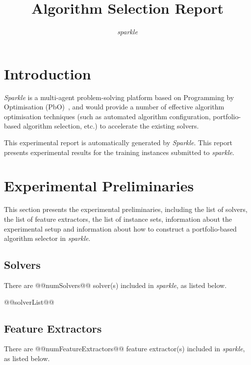 \documentclass[british]{article}
\title{Algorithm Selection Report}
\author{ \emph{sparkle} }
\newif\iftest
\begin{document}
\maketitle %


\section{Introduction}
\label{sec:Introduction}

\emph{Sparkle} \cite{Hoos15} is a multi-agent problem-solving platform based on Programming by Optimisation (PbO)~\cite{Hoos12}, and would provide a number of effective algorithm optimisation techniques (such as automated algorithm configuration, portfolio-based algorithm selection, etc.) to accelerate the existing solvers.

This experimental report is automatically generated by \emph{Sparkle}. This report presents experimental results for the training instances submitted to \emph{sparkle}\iftest, as well as for running the \emph{sparkle} portfolio selector to solve the test instances in the instance set @@testInstanceClass@@\fi.

\section{Experimental Preliminaries}
\label{sec:Experimental_Preliminaries}

This section presents the experimental preliminaries, including the list of solvers, the list of feature extractors, the list of instance sets, information about the experimental setup and information about how to construct a portfolio-based algorithm selector in \emph{sparkle}.

\subsection{Solvers}
\label{sec:Solvers}
There are @@numSolvers@@ solver(s) included in \emph{sparkle}, as listed below.

\begin{enumerate} 
@@solverList@@
\end{enumerate}

\subsection{Feature Extractors}
\label{sec:Feature_Extractors}
There are @@numFeatureExtractors@@ feature extractor(s) included in \emph{sparkle}, as listed below.
\end{document}
